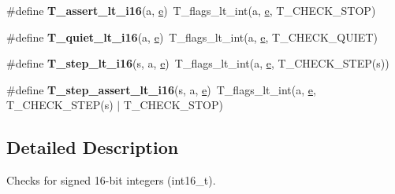 \begin{DoxyCompactItemize}
\item 
\mbox{\label{group__RTEMSTestFrameworkChecksInt16_ga0d1a868c03dc237def5671e74489a113}} 
\#define {\bfseries T\+\_\+assert\+\_\+lt\+\_\+i16}(a,  \mbox{\hyperlink{sun4u_2tte_8h_a8b0b9ed08e0e18920ec2682f48228c27}{e}})~T\+\_\+flags\+\_\+lt\+\_\+int(a, \mbox{\hyperlink{sun4u_2tte_8h_a8b0b9ed08e0e18920ec2682f48228c27}{e}}, T\+\_\+\+C\+H\+E\+C\+K\+\_\+\+S\+T\+OP)
\item 
\mbox{\label{group__RTEMSTestFrameworkChecksInt16_ga398203b9d0716c6a5517b06e13870884}} 
\#define {\bfseries T\+\_\+quiet\+\_\+lt\+\_\+i16}(a,  \mbox{\hyperlink{sun4u_2tte_8h_a8b0b9ed08e0e18920ec2682f48228c27}{e}})~T\+\_\+flags\+\_\+lt\+\_\+int(a, \mbox{\hyperlink{sun4u_2tte_8h_a8b0b9ed08e0e18920ec2682f48228c27}{e}}, T\+\_\+\+C\+H\+E\+C\+K\+\_\+\+Q\+U\+I\+ET)
\item 
\mbox{\label{group__RTEMSTestFrameworkChecksInt16_ga2df6d4371f71a93a575ddce2484148d8}} 
\#define {\bfseries T\+\_\+step\+\_\+lt\+\_\+i16}(s,  a,  \mbox{\hyperlink{sun4u_2tte_8h_a8b0b9ed08e0e18920ec2682f48228c27}{e}})~T\+\_\+flags\+\_\+lt\+\_\+int(a, \mbox{\hyperlink{sun4u_2tte_8h_a8b0b9ed08e0e18920ec2682f48228c27}{e}}, T\+\_\+\+C\+H\+E\+C\+K\+\_\+\+S\+T\+EP(s))
\item 
\mbox{\label{group__RTEMSTestFrameworkChecksInt16_ga7b9a748f6c7cfc8d07a31b621aca6bbb}} 
\#define {\bfseries T\+\_\+step\+\_\+assert\+\_\+lt\+\_\+i16}(s,  a,  \mbox{\hyperlink{sun4u_2tte_8h_a8b0b9ed08e0e18920ec2682f48228c27}{e}})~T\+\_\+flags\+\_\+lt\+\_\+int(a, \mbox{\hyperlink{sun4u_2tte_8h_a8b0b9ed08e0e18920ec2682f48228c27}{e}}, T\+\_\+\+C\+H\+E\+C\+K\+\_\+\+S\+T\+EP(s) $\vert$ T\+\_\+\+C\+H\+E\+C\+K\+\_\+\+S\+T\+OP)
\end{DoxyCompactItemize}


\subsection{Detailed Description}
Checks for signed 16-\/bit integers (int16\+\_\+t). 

